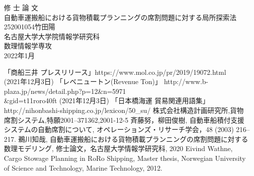 \documentclass[uplatex]{ujreport}
\begin{document}
\begin{table}[b]
\begin{center}
{\huge 修\hspace{0.1cm} 士\hspace{0.1cm} 論\hspace{0.1cm} 文}\\[2.5cm]
{\huge 自動車運搬船における貨物積載プランニングの席割問題に対する局所探索法}\\[6cm]
{\huge 252001054\qquad 竹田陽}\\[1cm]
{\huge 名古屋大学大学院情報学研究科}\\[0.5cm]
{\huge 数理情報学専攻}\\[0.5cm]
{\huge 2022年1月}\\
\end{center}
\end{table}


\thispagestyle{empty}
\clearpage
\newpage
{}
\setcounter{page}{1}







\thispagestyle{empty}
\tableofcontents
\newpage
\setcounter{page}{1}
\pagestyle{plain}















\begin{thebibliography}{99}
 「商船三井 プレスリリース」https://www.mol.co.jp/pr/2019/19072.html \\ (2021年12月3日)
 「レベニュートン(Revenue Ton)」 http://www.b-plaza.jp/news/detail.php?p=12\&n=5971 \\
\&gid=t11roro40ft (2021年12月3日)
 「日本橋海運 貿易関連用語集」http://nihonbashi-shipping.co.jp/lexicon/50\_su/
  株式会社構造計画研究所,貨物席割システム,特願2001--371362,2001-12-5
 斉藤努，柳田俊樹, 自動車船積付支援システムの自動席割について, オペレーションズ・リサーチ学会，48 (2003) 216--217.
 鵜川知哉, 自動車運搬船における貨物積載プランニングの席割問題に対する数理モデリング, 修士論文，名古屋大学情報学研究科, 2020
Eivind Wathne, Cargo Stowage Planning in RoRo Shipping, Master thesis, Norwegian University of Science and Technology, Marine Technology, 2012.
\end{thebibliography}
\end{document}
